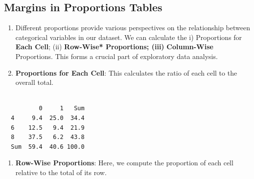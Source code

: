 \documentclass[
  letterpaper,
  DIV=11,
  numbers=noendperiod]{scrreport}
\newenvironment{Shaded}{\begin{snugshade}}{\end{snugshade}}
\newcommand{\AttributeTok}[1]{\textcolor[rgb]{0.40,0.45,0.13}{#1}}
\newcommand{\DecValTok}[1]{\textcolor[rgb]{0.68,0.00,0.00}{#1}}
\newcommand{\FunctionTok}[1]{\textcolor[rgb]{0.28,0.35,0.67}{#1}}
\newcommand{\NormalTok}[1]{\textcolor[rgb]{0.00,0.23,0.31}{#1}}
\newcommand{\SpecialCharTok}[1]{\textcolor[rgb]{0.37,0.37,0.37}{#1}}
\newcommand{\StringTok}[1]{\textcolor[rgb]{0.13,0.47,0.30}{#1}}
\providecommand{\tightlist}{%
  \setlength{\itemsep}{0pt}\setlength{\parskip}{0pt}}\usepackage{longtable,booktabs,array}
\begin{document}
\hypertarget{margins-in-proportions-tables}{%
\subsection{Margins in Proportions
Tables}\label{margins-in-proportions-tables}}

\begin{enumerate}
\def\labelenumi{\arabic{enumi}.}
\item
  Different proportions provide various perspectives on the relationship
  between categorical variables in our dataset. We can calculate the i)
  Proportions for \textbf{Each Cell}; (ii) \textbf{Row-Wise*
  Proportions; (iii)} \textbf{Column-Wise} Proportions. This forms a
  crucial part of exploratory data analysis.
\item
  \textbf{Proportions for Each Cell}: This calculates the ratio of each
  cell to the overall total.
\end{enumerate}

\begin{Shaded}
\end{Shaded}

\begin{verbatim}
     
          0     1   Sum
  4     9.4  25.0  34.4
  6    12.5   9.4  21.9
  8    37.5   6.2  43.8
  Sum  59.4  40.6 100.0
\end{verbatim}

\begin{enumerate}
\def\labelenumi{\arabic{enumi}.}
\setcounter{enumi}{2}
\tightlist
\item
  \textbf{Row-Wise Proportions}: Here, we compute the proportion of each
  cell relative to the total of its row.
\end{enumerate}

\begin{Shaded}
\end{Shaded}
\end{document}

